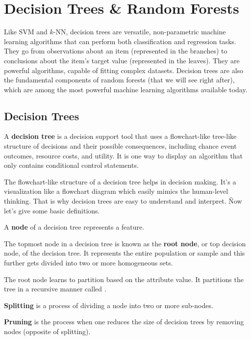 \section{Decision Trees \& Random Forests}

Like SVM and $k$-NN, decision trees are versatile, non-parametric machine learning algorithms that can perform both
classification and regression tasks. They go from observations about an item (represented in the branches) to
conclusions about the item's target value (represented in the leaves). They are powerful algorithms, capable of
fitting complex datasets. Decision trees are also the fundamental components of random forests (that we will see
right after), which are among the most powerful machine learning algorithms available today.

\subsection{Decision Trees}

A \textbf{decision tree} is a decision support tool that uses a flowchart-like tree-like structure of decisions and
their possible consequences, including chance event outcomes, resource costs, and utility. It is one way to display
an algorithm that only contains conditional control statements.
\ed

The flowchart-like structure of a decision tree helps in decision making. It's a visualization like a flowchart
diagram which easily mimics the human-level thinking. That is why decision trees are easy to understand and interpret. \v

Now let's give some basic definitions.

\bd [Node]
A \textbf{node} of a decision tree represents a feature.
\ed

The topmost node in a decision tree is known as the \textbf{root node}, or top decision node, of the decision tree.
It represents the entire population or sample and this further gets divided into two or more homogeneous sets.
\ed

The root node learns to partition based on the attribute value. It partitions the tree in a recursive manner called
.

\bd [Splitting]
\textbf{Splitting} is a process of dividing a node into two or more sub-nodes.
\ed

\bd [Pruning]
\textbf{Pruning} is the process when one reduces the size of decision trees by removing nodes (opposite of splitting).
\ed

